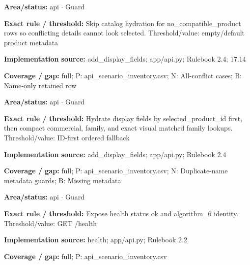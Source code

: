 \begin{tcolorbox}[enhanced,breakable,colback=white,colframe=Muted!45,boxrule=0.45pt,arc=1.5pt,left=6pt,right=6pt,top=5pt,bottom=5pt,title={\texttt{API-DISPLAY-CONFLICT-07}},title after break={\texttt{API-DISPLAY-CONFLICT-07}\ (continued)},fonttitle=\headingfont\bfseries\color{Navy},coltitle=Navy]
\textbf{Area/status:} api $\boldsymbol{\cdot}$ Guard\par
\smallskip
\textbf{Exact rule / threshold:} Skip catalog hydration for no\_\allowbreak{}compatible\_\allowbreak{}product rows so conflicting details cannot look selected. Threshold/\allowbreak{}value: empty/\allowbreak{}default product metadata\par
\smallskip
\textbf{Implementation source:} add\_\allowbreak{}display\_\allowbreak{}fields; app/\allowbreak{}api.py; Rulebook 2.4; 17.14\par
\smallskip
\textbf{Coverage / gap:} full; P: api\_\allowbreak{}scenario\_\allowbreak{}inventory.csv; N: All-conflict cases; B: Name-only retained row
\end{tcolorbox}
\begin{tcolorbox}[enhanced,breakable,colback=white,colframe=Muted!45,boxrule=0.45pt,arc=1.5pt,left=6pt,right=6pt,top=5pt,bottom=5pt,title={\texttt{API-DISPLAY-ID-FIRST-06}},title after break={\texttt{API-DISPLAY-ID-FIRST-06}\ (continued)},fonttitle=\headingfont\bfseries\color{Navy},coltitle=Navy]
\textbf{Area/status:} api $\boldsymbol{\cdot}$ Guard\par
\smallskip
\textbf{Exact rule / threshold:} Hydrate display fields by selected\_\allowbreak{}product\_\allowbreak{}id first, then compact commercial, family, and exact visual matched family lookups. Threshold/\allowbreak{}value: ID-first ordered fallback\par
\smallskip
\textbf{Implementation source:} add\_\allowbreak{}display\_\allowbreak{}fields; app/\allowbreak{}api.py; Rulebook 2.4\par
\smallskip
\textbf{Coverage / gap:} full; P: api\_\allowbreak{}scenario\_\allowbreak{}inventory.csv; N: Duplicate-name metadata guards; B: Missing metadata
\end{tcolorbox}
\begin{tcolorbox}[enhanced,breakable,colback=white,colframe=Muted!45,boxrule=0.45pt,arc=1.5pt,left=6pt,right=6pt,top=5pt,bottom=5pt,title={\texttt{API-HEALTH-05}},title after break={\texttt{API-HEALTH-05}\ (continued)},fonttitle=\headingfont\bfseries\color{Navy},coltitle=Navy]
\textbf{Area/status:} api $\boldsymbol{\cdot}$ Guard\par
\smallskip
\textbf{Exact rule / threshold:} Expose health status ok and algorithm\_\allowbreak{}6 identity. Threshold/\allowbreak{}value: GET /\allowbreak{}health\par
\smallskip
\textbf{Implementation source:} health; app/\allowbreak{}api.py; Rulebook 2.2\par
\smallskip
\textbf{Coverage / gap:} full; P: api\_\allowbreak{}scenario\_\allowbreak{}inventory.csv
\end{tcolorbox}

